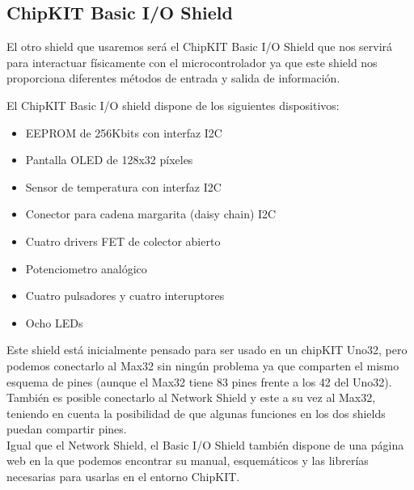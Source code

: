 \newpage


\subsection{ChipKIT Basic I/O Shield}
El otro shield que usaremos será el ChipKIT Basic I/O Shield que nos servirá para interactuar físicamente con el microcontrolador ya que este shield nos proporciona diferentes métodos de entrada y salida de información.


El ChipKIT Basic I/O shield dispone de los siguientes dispositivos:
\begin{itemize}
	\item EEPROM de 256Kbits con interfaz I2C
	\item Pantalla OLED de 128x32 píxeles
	\item Sensor de temperatura con interfaz I2C
	\item Conector para cadena margarita (daisy chain) I2C
	\item Cuatro drivers FET de colector abierto
	\item Potenciometro analógico
	\item Cuatro pulsadores y cuatro interuptores
	\item Ocho LEDs
\end{itemize}

Este shield está inicialmente pensado para ser usado en un chipKIT Uno32, pero podemos conectarlo al Max32 sin ningún problema ya que comparten el mismo esquema de pines (aunque el Max32 tiene 83 pines frente a los 42 del Uno32). También es posible conectarlo al Network Shield y este a su vez al Max32, teniendo en cuenta la posibilidad de que algunas funciones en los dos shields puedan compartir pines.\\

Igual que el Network Shield, el Basic I/O Shield también dispone de una página web\cite{website:io_shield} en la que podemos encontrar su manual, esquemáticos y las librerías necesarias para usarlas en el entorno ChipKIT.